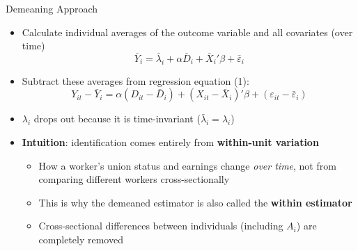 \documentclass[dvipsnames,hyperref={pdfpagelabels=false}]{beamer}
\begin{document}
\begin{frame}{Demeaning Approach}{}
	\begin{itemize}
		\item[1] Calculate individual averages of the outcome variable and all covariates (over time)
		\begin{equation*}
			\bar{Y}_{i}=\bar{\lambda}_{i}+\alpha\bar{D}_{i}+\bar{X}_i'\beta+\bar{\varepsilon}_i
		\end{equation*}

		\item[2] Subtract these averages from regression equation (1):
		\begin{equation*}
			Y_{it}-\bar{Y}_{i}=\alpha(D_{it}-\bar{D}_i)+(X_{it}-\bar{X}_{i})'\beta+(\varepsilon_{it}-\bar{\varepsilon}_i)
		\end{equation*}

		\item $\lambda_i$ drops out because it is time-invariant ($\bar{\lambda}_i = \lambda_i$)
		\vspace{0.2cm}
		\item \textbf{Intuition}: identification comes entirely from \textbf{within-unit variation} 
		\vspace{0.2cm}
		\begin{itemize}
        \item How a worker's union status and earnings change \textit{over time}, not from comparing different workers cross-sectionally
        \vspace{0.2cm}
			\item This is why the demeaned estimator is also called the \textbf{within estimator}
			\vspace{0.2cm}
			\item Cross-sectional differences between individuals (including $A_i$) are completely removed
		\end{itemize}
	\end{itemize}
\end{frame}
\end{document}
